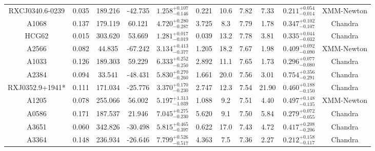 \documentclass{aa}   %
\begin{document}
\begin{table}[h!]
\begin{center}
\begin{tabular}{ c  c  c  c c c c c c c c }
RXCJ0340.6-0239     		&		0.035	&	189.216	&	-42.735	& $	1.258^{+0.107}_{-0.146}$  &      0.221	&  10.6	&	7.82	&	7.33	&	$ 0.211^{+0.054}_{-0.014}  $ &	 XMM-Newton   \\
A1068               		&		0.137	&	179.119	&	60.121	& $	4.720^{+0.280}_{-0.287}$  &      3.725	&  8.3	&	7.79	&	1.78	&	$ 0.347^{+0.102}_{-0.107}  $ &	  Chandra     \\
HCG62               		&		0.015	&	303.620	&	53.669	& $	1.281^{+0.017}_{-0.019}$  &      0.039	&  13.2	&	7.78	&	3.81	&	$ 0.335^{+0.044}_{-0.032}  $ &	  Chandra     \\
A2566               		&		0.082	&	44.835	&	-67.242	& $	3.134^{+0.413}_{-0.377}$  &      1.205	&  18.2	&	7.67	&	1.98	&	$ 0.409^{+0.092}_{-0.090}  $ &	  XMM-Newton  \\
A1033               		&		0.126	&	189.303	&	59.229	& $	6.333^{+0.252}_{-0.250}$  &      2.892	&  11.1	&	7.65	&	1.73	&	$ 0.296^{+0.077}_{-0.080}  $ &	  Chandra     \\
A2384               		&		0.094	&	33.541	&	-48.431	& $	5.830^{+0.270}_{-0.260}$  &      1.661	&  20.0	&	7.56	&	3.01	&	$ 0.754^{+0.356}_{-0.291}  $ &	  Chandra     \\
RXJ0352.9+1941*     		&		0.111	&	171.034	&	-25.776	& $	3.370^{+0.170}_{-0.230}$  &      2.747	&  12.3	&	7.54	&	21.90	&	$ 0.460^{+0.188}_{-0.150}  $ &	 Chandra      \\
A1205               		&		0.078	&	255.066	&	56.002	& $	5.197^{+1.313}_{-1.039}$  &      1.088	&  9.2	&	7.51	&	4.40	&	$ 0.497^{+0.148}_{-0.135}  $ &	  XMM-Newton  \\
A0586               		&		0.171	&	187.537	&	21.946	& $	7.045^{+0.275}_{-0.230}$  &      5.620	&  9.1	&	7.50	&	5.84	&	$ 0.279^{+0.072}_{-0.055}  $ &	  Chandra     \\
A3651               		&		0.060	&	342.826	&	-30.498	& $	5.815^{+0.465}_{-0.397}$  &      0.622	&  17.0	&	7.43	&	4.72	&	$ 0.417^{+0.208}_{-0.206}  $ &	  Chandra     \\
A3364               		&		0.148	&	236.934	&	-26.646	& $	7.799^{+0.526}_{-0.517}$  &      4.363	&  7.5	&	7.36	&	2.27	&	$ 0.212^{+0.158}_{-0.117}  $ &	  Chandra     \\

 \hline 
 

\end{tabular}
\end{center}
\end{table}
\end{document}
